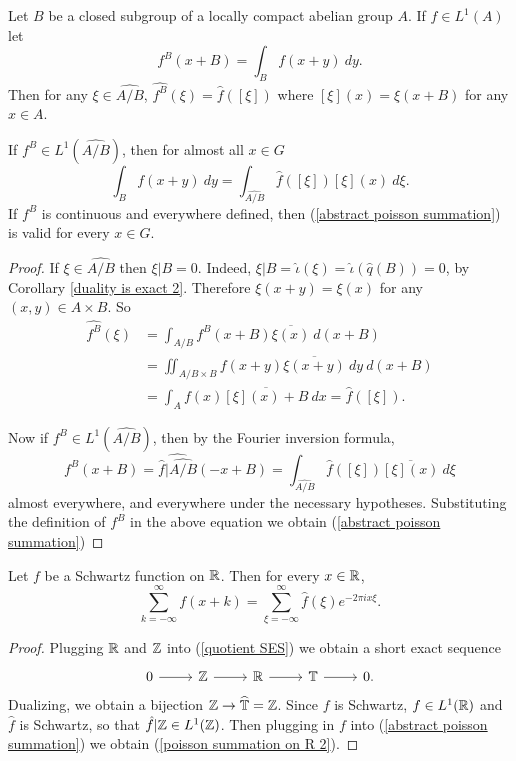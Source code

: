 \begin{theorem}
Let $B$ be a closed subgroup of a locally compact abelian group $A$.
If $f \in L^1(A)$ let
$$f^B(x + B) = \int_B f(x + y)~dy.$$
Then for any $\xi \in \widehat{A/B}$, $\widehat{f^B}(\xi) = \hat f([\xi])$
where $[\xi](x) = \xi(x + B)$ for any $x \in A$.

If $f^B \in L^1(\widehat{A/B})$, then for almost all $x \in G$
\begin{equation}
\label{abstract poisson summation}
\int_B f(x + y)~dy = \int_{\widehat{A/B}} \hat f([\xi]) [\xi](x) ~d\xi.
\end{equation}
If $f^B$ is continuous and everywhere defined, then (\ref{abstract poisson summation}) is valid for every $x \in G$.
\end{theorem}
\begin{proof}
If $\xi \in \widehat{A/B}$ then $\xi|B = 0$. Indeed, $\xi|B = \hat \iota(\xi) = \hat \iota(\hat q(B)) = 0$, by Corollary \ref{duality is exact 2}.
Therefore $\xi(x + y) = \xi(x)$ for any $(x, y) \in A \times B$.
So
\begin{align*}\widehat{f^B}(\xi) &= \int_{A/B} f^B(x + B) \overline{\xi(x)}~d(x + B)\\& = \iint_{A/B \times B} f(x + y) \overline{\xi(x + y)}~dy~d(x+B) \\&= \int_A f(x)\overline{[\xi](x) + B}~dx = \hat f([\xi]).\end{align*}

Now if $f^B \in L^1(\widehat{A/B})$, then by the Fourier inversion formula,
$$f^B(x + B) = \widehat{\hat f|\widehat{A/B}}(-x + B) = \int_{\widehat{A/B}} \hat f([\xi]) \overline{[\xi](x)}~d\xi$$
almost everywhere, and everywhere under the necessary hypotheses.
Substituting the definition of $f^B$ in the above equation we obtain (\ref{abstract poisson summation})
\end{proof}

\begin{corollary}
\label{poisson summation on R}
Let $f$ be a Schwartz function on $\mathbb{R}$. Then for every $x \in \mathbb{R}$,
\begin{equation}
\label{poisson summation on R 2}
\sum_{k=-\infty}^\infty f(x + k) = \sum_{\xi = -\infty}^\infty \hat f(\xi) e^{-2\pi ix\xi}.
\end{equation}
\end{corollary}
\begin{proof}
Plugging $\mathbb{R}$ and $\mathbb{Z}$ into (\ref{quotient SES}) we obtain a short exact sequence
$$\begin{tikzcd}
0 \arrow[r] & \ZZ \arrow[r] & \RR \arrow[r] & \Torus \arrow[r] & 0.
\end{tikzcd}$$
Dualizing, we obtain a bijection $\mathbb{Z} \to \widehat{\mathbb{T}} = \mathbb{Z}$.
Since $f$ is Schwartz, $f \in L^1(\mathbb{R})$ and $\hat f$ is Schwartz, so that $\hat f|\mathbb{Z} \in L^1(\mathbb{Z})$.
Then plugging in $f$ into (\ref{abstract poisson summation}) we obtain (\ref{poisson summation on R 2}).
\end{proof}

